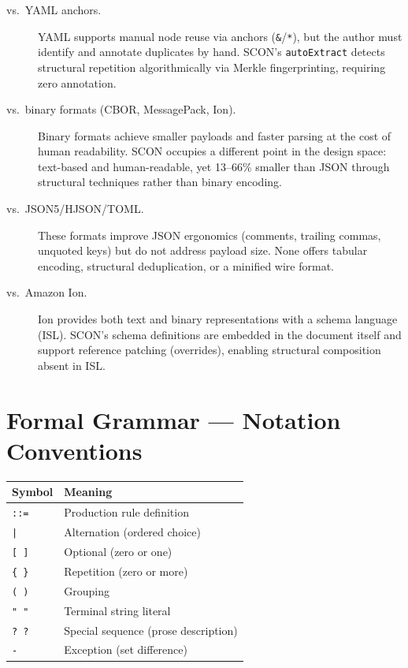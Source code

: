 \documentclass[11pt, a4paper]{article}
\begin{document}
\begin{description}
\item[vs.\ YAML anchors.]
  YAML supports manual node reuse via anchors (\texttt{\&}/\texttt{*}),
  but the author must identify and annotate duplicates by hand.
  SCON's \texttt{autoExtract} detects structural repetition
  algorithmically via Merkle fingerprinting, requiring zero annotation.

\item[vs.\ binary formats (CBOR, MessagePack, Ion).]
  Binary formats achieve smaller payloads and faster parsing at the
  cost of human readability. SCON occupies a different point in the
  design space: text-based and human-readable, yet 13--66\% smaller
  than JSON through structural techniques rather than binary encoding.

\item[vs.\ JSON5/HJSON/TOML.]
  These formats improve JSON ergonomics (comments, trailing commas,
  unquoted keys) but do not address payload size. None offers
  tabular encoding, structural deduplication, or a minified
  wire format.

\item[vs.\ Amazon Ion.]
  Ion provides both text and binary representations with a schema
  language (ISL). SCON's schema definitions are embedded in the
  document itself and support reference patching (overrides),
  enabling structural composition absent in ISL.
\end{description}


\section{Formal Grammar --- Notation Conventions}
\label{sec:notation}

\begin{tabular}{ll}
\toprule
Symbol & Meaning \\
\midrule
\texttt{::=}   & Production rule definition \\
\texttt{|}     & Alternation (ordered choice) \\
\texttt{[ ]}   & Optional (zero or one) \\
\texttt{\{ \}} & Repetition (zero or more) \\
\texttt{( )}   & Grouping \\
\texttt{" "}   & Terminal string literal \\
\texttt{? ?}   & Special sequence (prose description) \\
\texttt{-}     & Exception (set difference) \\
\bottomrule
\end{tabular}
\end{document}
